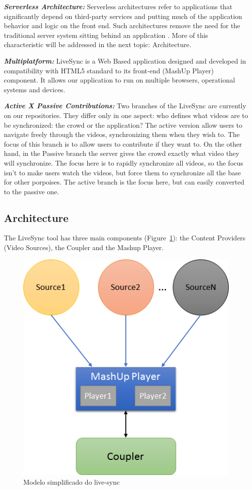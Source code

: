 \documentclass[jidm,a4paper]{jidm} %
\begin{document}
\textbf{\textit{Serverless Architecture:}} Serverless architectures refer to applications that significantly depend on third-party services and putting much of the application behavior and logic on the front end. Such architectures remove the need for the traditional server system sitting behind an application \cite{RobertServerless}. More of this characteristic will be addressed in the next topic: Architecture.

\textbf{\textit{Multiplatform:}} LiveSync is a Web Based application designed and developed in compatibility with HTML5 standard to its front-end (MashUp Player) component. It allows our application to run on multiple browsers, operational systems and devices.

\textbf{\textit{Active X Passive Contributions:}} Two branches of the LiveSync are currently on our repositories. They differ only in one aspect: who defines what videos are to be synchronized: the crowd or the application? The active version allow users to navigate freely through the videos, synchronizing them when they wish to. The focus of this branch is to allow users to contribute if they want to. On the other hand, in the Passive branch the server gives the crowd exactly what video they will synchronize. The focus here is to rapidly synchronize all videos, so the focus isn't to make users watch the videos, but force them to synchronize all the base for other porpoises. The active branch is the focus here, but can easily converted to the passive one.

\subsection{Architecture}
The LiveSync tool has three main components (Figure~\ref{livesync}): the Content Providers (Video Sources), the Coupler and the Mashup Player.

\begin{figure}
	\centerline{\includegraphics[scale=0.4] {figure/arqchitecture}}
	\caption{Modelo simplificado do live-sync}
	\label{livesync}
\end{figure}
\end{document}
